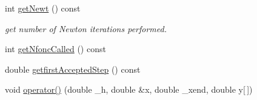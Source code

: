 \begin{DoxyCompactItemize}
int \hyperlink{classodes_1_1Radau5cc_a9dd359045cfe3667949697176a2be296}{get\+Newt} () const 
\begin{DoxyCompactList}\small\item\em get number of Newton iterations performed. \end{DoxyCompactList}\item 
int \hyperlink{classodes_1_1Radau5cc_a49eecba7aba4da1dca5fe5f3848cab34}{get\+Nfonc\+Called} () const 
\item 
double \hyperlink{classodes_1_1Radau5cc_a44a8f7a188fc1171f059ffcebbf15de2}{getfirst\+Accepted\+Step} () const 
\item 
void \hyperlink{classodes_1_1Radau5cc_aee81c868cdc434f266e495a72689cec5}{operator()} (double \+\_\+h, double \&x, double \+\_\+xend, double y\mbox{[}$\,$\mbox{]})
\end{DoxyCompactItemize}
